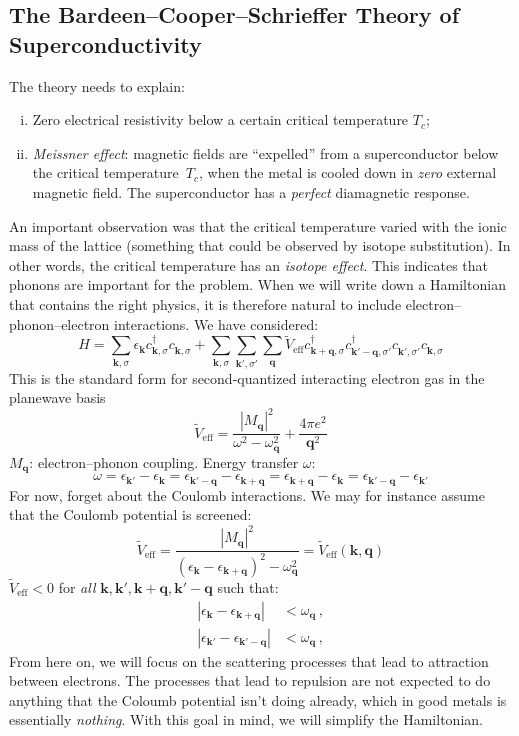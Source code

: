 \subsection{The Bardeen--Cooper--Schrieffer Theory of Superconductivity}
The theory needs to explain:
\begin{enumerate}[(i)]
  \item Zero electrical resistivity below a certain critical temperature $T_c$;
  \item \emph{Meissner effect}: magnetic fields are ``expelled'' from a superconductor below the critical temperature~$T_c$, when the metal is cooled down in \emph{zero} external magnetic field.
        The superconductor has a \emph{perfect} diamagnetic response.
\end{enumerate}
An important observation was that the critical temperature varied with the ionic mass of the lattice (something that could be observed by isotope substitution).
In other words, the critical temperature has an \emph{isotope effect}.
This indicates that phonons are important for the problem.
When we will write down a Hamiltonian that contains the right physics, it is therefore natural to include electron--phonon--electron interactions.
We have considered:
\[
  H = \sum_{\bm k,\sigma} \epsilon_{\bm k} c^\dagger_{\bm k,\sigma} c^{\phantom{\dagger}}_{\bm k,\sigma}
    + \sum_{\bm k,\sigma} \sum_{\bm k',\sigma'}\sum_{\bm q} \tilde{V}_\textrm{eff} c^\dagger_{\bm k+\bm q,\sigma} c^\dagger_{\bm k'-\bm q,\sigma'} c^{\phantom{\dagger}}_{\bm k',\sigma'} c^{\phantom{\dagger}}_{\bm k,\sigma}
\]
This is the standard form for second-quantized interacting electron gas in the planewave basis
\[
  \tilde{V}_\textrm{eff} = \frac{|M_{\bm q}|^2}{\omega^2-\omega^2_{\bm q}} + \frac{4\pi e^2}{\bm q^2}
\]
$M_{\bm q}$: electron--phonon coupling.
Energy transfer $\omega$:
\[
  \omega = \epsilon_{\bm k'} - \epsilon_{\bm k} = \epsilon_{\bm k'-\bm q} - \epsilon_{\bm k + \bm q} = \epsilon_{\bm k+\bm q} - \epsilon_{\bm k} = \epsilon_{\bm k'-\bm q} - \epsilon_{\bm k'}
\]
For now, forget about the Coulomb interactions.
We may for instance assume that the Coulomb potential is screened:
\[
  \tilde{V}_\textrm{eff} = \frac{|M_{\bm q}|^2}{(\epsilon_{\bm k}-\epsilon_{\bm k+\bm q})^2 - \omega_{\bm q}^2} = \tilde{V}_\textrm{eff}(\bm k,\bm q)
\]
$\tilde{V}_\textrm{eff} < 0$ for \emph{all} $\bm k, \bm k', \bm k+\bm q, \bm k'-\bm q$ such that:
\[
  \begin{aligned}
    |\epsilon_{\bm k}  - \epsilon_{\bm k+\bm q}|  &< \omega_{\bm q} \,, \\
    |\epsilon_{\bm k'} - \epsilon_{\bm k'-\bm q}| &< \omega_{\bm q} \,, 
  \end{aligned}
\]
From here on, we will focus on the scattering processes that lead to attraction between electrons.
The processes that lead to repulsion are not expected to do anything that the Coloumb potential isn't doing already, which in good metals is essentially \emph{nothing}.
With this goal in mind, we will simplify the Hamiltonian.

